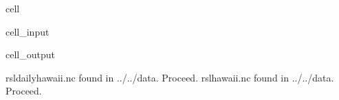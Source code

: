 \documentclass[letterpaper,10pt,english]{jupyterBook}
\begin{document}
\begin{sphinxuseclass}{cell}
\begin{sphinxVerbatimInput}
\begin{sphinxuseclass}{cell_input}
\end{sphinxuseclass}\end{sphinxVerbatimInput}
\begin{sphinxVerbatimOutput}

\begin{sphinxuseclass}{cell_output}
\begin{sphinxVerbatim}[commandchars=\\\{\}]
rsl\PYGZus{}daily\PYGZus{}hawaii.nc found in ../../data. Proceed.
rsl\PYGZus{}hawaii.nc found in ../../data. Proceed.
\end{sphinxVerbatim}

\end{sphinxuseclass}\end{sphinxVerbatimOutput}

\end{sphinxuseclass}
\end{document}
